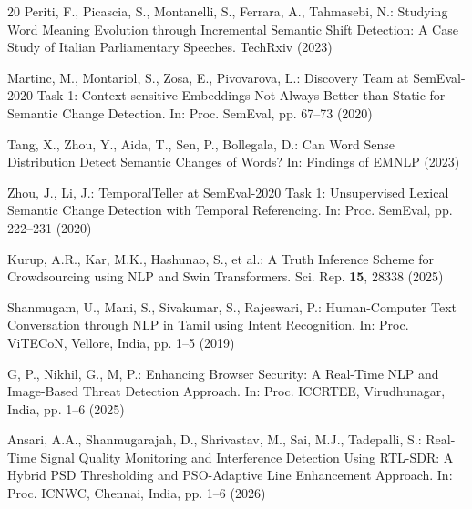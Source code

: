 \documentclass{llncs}
\begin{document}
\begin{thebibliography}{20}
Periti, F., Picascia, S., Montanelli, S., Ferrara, A., Tahmasebi, N.: Studying Word Meaning Evolution through Incremental Semantic Shift Detection: A Case Study of Italian Parliamentary Speeches. TechRxiv (2023)

Martinc, M., Montariol, S., Zosa, E., Pivovarova, L.: Discovery Team at SemEval-2020 Task 1: Context-sensitive Embeddings Not Always Better than Static for Semantic Change Detection. In: Proc. SemEval, pp. 67--73 (2020)

Tang, X., Zhou, Y., Aida, T., Sen, P., Bollegala, D.: Can Word Sense Distribution Detect Semantic Changes of Words? In: Findings of EMNLP (2023)

Zhou, J., Li, J.: TemporalTeller at SemEval-2020 Task 1: Unsupervised Lexical Semantic Change Detection with Temporal Referencing. In: Proc. SemEval, pp. 222--231 (2020)

Kurup, A.R., Kar, M.K., Hashunao, S., et al.: A Truth Inference Scheme for Crowdsourcing using NLP and Swin Transformers. Sci. Rep. \textbf{15}, 28338 (2025)

Shanmugam, U., Mani, S., Sivakumar, S., Rajeswari, P.: Human-Computer Text Conversation through NLP in Tamil using Intent Recognition. In: Proc. ViTECoN, Vellore, India, pp. 1--5 (2019)

G, P., Nikhil, G., M, P.: Enhancing Browser Security: A Real-Time NLP and Image-Based Threat Detection Approach. In: Proc. ICCRTEE, Virudhunagar, India, pp. 1--6 (2025)

Ansari, A.A., Shanmugarajah, D., Shrivastav, M., Sai, M.J., Tadepalli, S.: Real-Time Signal Quality Monitoring and Interference Detection Using RTL-SDR: A Hybrid PSD Thresholding and PSO-Adaptive Line Enhancement Approach. In: Proc. ICNWC, Chennai, India, pp. 1--6 (2026)

\end{thebibliography}
\end{document}
